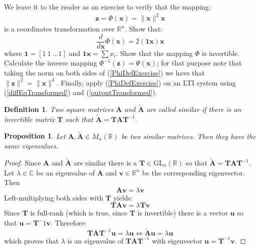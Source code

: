 \documentclass[a4paper,10pt,oneside]{book}
\newtheorem{definition}{Definition}
\newtheorem{proposition}[theorem]{Proposition}
\begin{document}
\noindent We leave it to the reader as an exercise to verify that the mapping:
\begin{eqnarray}\label{quadraticTransformation}
 \mathbf{z}=\Phi(\mathbf{x})=\| \mathbf{x} \|^2 \mathbf{x}\label{PhiDefExercise}
\end{eqnarray}
is a coordinates transformation over $\mathbb{R}^n$. Show that:
\begin{equation}
 \frac{d}{d\mathbf{x}}\Phi(\mathbf{x})=2(\mathbf{1x})\mathbf{x}
\end{equation}
where $\mathbf{1}=[1\ 1\ \ldots 1]$ and $\mathbf{1x}=\sum x_i$. Show that the mapping $\Phi$ is invertible. Calculate the inverse mapping $\Phi^{-1}(\mathbf{z})=\Psi(\mathbf{x})$; for that purpose note that taking the norm on both sides of (\ref{PhiDefExercise}) we have that $\| \mathbf{z} \|^2=\|\mathbf{x}\|^3$. Finally, apply (\ref{PhiDefExercise}) on an LTI system using (\ref{diffEqTransformed}) and (\ref{outputTransformed}).

\begin{definition}
 Two square matrices $\mathbf{A}$ and $\tilde{\mathbf{A}}$ are called similar if there is an invertible matrix $\mathbf{T}$ such that $\tilde{\mathbf{A}}=\mathbf{TAT}^{-1}$.
\end{definition}

\begin{proposition}
 Let $\mathbf{A},\tilde{\mathbf{A}}\in M_{n}(\mathbb{R})$ be two similar matrices. Then they have the same eigenvalues.
\end{proposition}
\begin{proof}
 Since $\mathbf{A}$ and $\tilde{\mathbf{A}}$ are similar there is a $\mathbf{T}\in \text{GL}_n(\mathbb{R})$ so that $\tilde{\mathbf{A}}=\mathbf{TAT}^{-1}$. Let $\lambda\in\mathbb{C}$ be an eigenvalue of $\mathbf{A}$ and $\mathbf{v}\in\mathbb{R}^n$ be the corresponding eigenvector. Then
\[\mathbf{Av}=\lambda \mathbf{v}\]
Left-multiplying both sides with $\mathbf{T}$ yields:
\[\mathbf{TAv}=\lambda \mathbf{Tv}\]
Since $\mathbf{T}$ is full-rank (which is true, since $\mathbf{T}$ is invertible) there is a vector $\mathbf{u}$ so that $\mathbf{u}=\mathbf{T}^-1\mathbf{v}$. Therefore:
\[\mathbf{TAT}^{-1}\mathbf{u}=\lambda \mathbf{u}\Leftrightarrow\tilde{\mathbf{A}}\mathbf{u}=\lambda\mathbf{u}\]
which proves that $\lambda$ is an eigenvalue of $\mathbf{TAT}^{-1}$ with eigenvector $\mathbf{u}=\mathbf{T}^{-1}\mathbf{v}$.
\end{proof}
\end{document}
